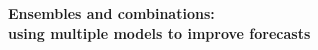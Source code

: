 \documentclass[11pt]{article}
\begin{document}
\def\spacingset#1{\renewcommand{\baselinestretch}%
{#1}\small\normalsize} \spacingset{1}

\begin{center}
{\bf\Large Ensembles and combinations:\\using multiple models to improve forecasts}
\end{center}


\bigskip


\spacingset{1.5} 




\begin{comment}

\section{Research beginnings}
\begin{itemize}
\item Goal
\item Application
\item Definition
\end{itemize}

\subsection{Combinations}

\cite{Barnard1963-xa} first proposed an empirical justification of forecast combination by making a simple average of two forecasts in forecasting airline passenger numbers. It was observed that a simple average of two forecasts outperformed each of them. This was the first work to provide an analysis for the problem of point forecast combination.

\cite{Bates1969-yj} further explored more possibilities for forecast combination by extending the simple average to a weighted combination, which examined various weight determination methods yield from past errors (MSE). It is concluded that combining forecasts with some independent information improves forecast accuracy.

\subsection{Ensembles}


\end{comment}
\end{document}

